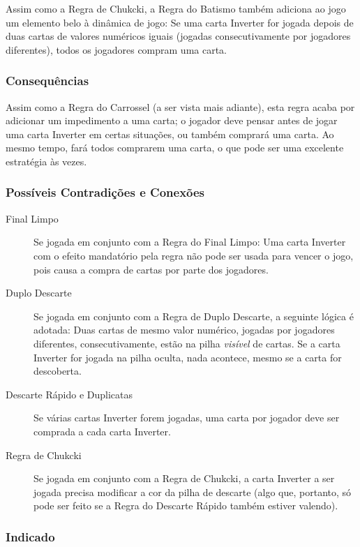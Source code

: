 Assim como a Regra de Chukcki, a Regra do Batismo também adiciona ao jogo um elemento belo à dinâmica de jogo: Se uma carta Inverter for jogada depois de duas cartas de valores numéricos iguais (jogadas consecutivamente por jogadores diferentes), todos os jogadores compram uma carta.

\subsubsection{Consequências}

Assim como a Regra do Carrossel (a ser vista mais adiante), esta regra acaba por adicionar um impedimento a uma carta; o jogador deve pensar antes de jogar uma carta Inverter em certas situações, ou também comprará uma carta. Ao mesmo tempo, fará todos comprarem uma carta, o que pode ser uma excelente estratégia às vezes.

\subsubsection{Possíveis Contradições e Conexões}

\begin{description}
\item[Final Limpo]{Se jogada em conjunto com a Regra do Final Limpo: Uma carta Inverter com o efeito mandatório pela regra não pode ser usada para vencer o jogo, pois causa a compra de cartas por parte dos jogadores.}
\item[Duplo Descarte]{Se jogada em conjunto com a Regra de Duplo Descarte, a seguinte lógica é adotada: Duas cartas de mesmo valor numérico, jogadas por jogadores diferentes, consecutivamente, estão na pilha \emph{visível} de cartas. Se a carta Inverter for jogada na pilha oculta, nada acontece, mesmo se a carta for descoberta.}
\item[Descarte Rápido e Duplicatas]{Se várias cartas Inverter forem jogadas, uma carta por jogador deve ser comprada a cada carta Inverter.}
\item[Regra de Chukcki]{Se jogada em conjunto com a Regra de Chukcki, a carta Inverter a ser jogada precisa modificar a cor da pilha de descarte (algo que, portanto, só pode ser feito se a Regra do Descarte Rápido também estiver valendo).}
\end{description}

\subsubsection{Indicado}

